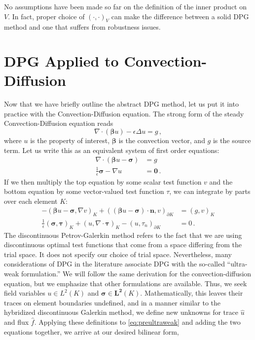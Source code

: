 \documentclass[letterpaper]{article}
\def\btau{\boldsymbol\tau}
\def\bsigma{\boldsymbol\sigma}
\def\bbeta{\boldsymbol\beta}
\newcommand{\bs}[1]{\boldsymbol{#1}}
\newcommand{\eqnref}[1]{\eqref{eq:#1}}
\newcommand{\mb}[1]{\mathbf{#1}}
\newcommand{\LRp}[1]{\left( #1 \right)}
\newcommand{\del}{\Delta}
\newcommand{\grad}{\nabla}
\renewcommand{\div}{\grad \cdot}
\begin{document}
No assumptions have been made so far on the definition of the inner product on
$V$. In fact, proper choice of $\LRp{\cdot,\cdot}_V$ can make the difference
between a solid DPG method and one that suffers from robustness issues.

\section{DPG Applied to Convection-Diffusion}
Now that we have briefly outline the abstract DPG method, let us put it into
practice with the Convection-Diffusion equation. The strong form of the
steady Convection-Diffusion equation reads
\[
\div(\bs\beta u)-\epsilon\del u=g\,,
\]
where $u$ is the property of interest, $\bs\beta$ is the convection vector,
and $g$ is the source term. Let us write this as an equivalent system of first
order equations:
\begin{align*}
\div(\bs\beta u-\bs\sigma)&=g\\
\frac{1}{\epsilon}\bs\sigma-\grad u&=\bs0\,.
\end{align*}
If we then multiply the top equation by some scalar test function $v$ and the
bottom equation by some vector-valued test function $\tau$, we can integrate by
parts over each element $K$:
\begin{equation}
\label{eq:preultraweak}
\begin{aligned}
-(\bbeta u-\bsigma,\nabla v)_K+((\bbeta
u-\bsigma)\cdot\mathbf{n},v)_{\partial K}&=(g,v)_K\\
\frac{1}{\epsilon}(\bsigma,\btau)_K+(u,\nabla\cdot\btau)_K
-(u,\tau_n)_{\partial K}&=0\,.
\end{aligned}
\end{equation}
The discontinuous Petrov-Galerkin method refers to the fact that we are using
discontinuous optimal test functions that come from a space differing from the
trial space. It does not specify our choice of trial space. Nevertheless, many
considerations of DPG in the literature \cite{} associate DPG with the
so-called ``ultra-weak formulation.'' We will follow the same derivation for
the convection-diffusion equation, but we emphasize that other formulations
are available. Thus, we seek field variables $u\in L^2(K)$ and
$\bsigma\in\mb{L^2}(K)$. Mathematically, this leaves their traces on element
boundaries undefined, and in a manner similar to the hybridized discontinuous
Galerkin method, we define new unknowns for trace $\hat u$ and flux $\hat f$.
Applying these definitions to \eqnref{preultraweak} and adding the two
equations together, we arrive at our desired bilinear form,
\end{document}
